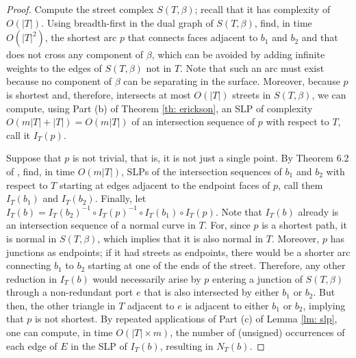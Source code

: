 \documentclass[11pt]{amsart}
\numberwithin{equation}{section}
\theoremstyle{plain}
\theoremstyle{definition}
\begin{document}
\begin{proof}
    Compute the street complex $S(T,\beta)$; recall that it has complexity of $O(|T|)$. 
    Using breadth-first in the dual graph of $S(T,\beta)$, find, in time $O(|T|^2)$, the shortest arc $p$ that connects faces adjacent to $b_1$ and $b_2$ and that does not cross any component of $\beta$, which can be avoided by adding infinite weights to the edges of $S(T,\beta)$ not in $T$. 
    Note that such an arc must exist because no component of $\beta$ can be separating in the surface. 
    Moreover, because $p$ is shortest and, therefore, intersects at most $O(|T|)$ streets in $S(T,\beta)$, we can compute, using Part (b) of Theorem \ref{th: erickson}, an SLP of complexity $O(m|T|+|T|)=O(m|T|)$ of an intersection sequence of $p$ with respect to $T$, call it $I_T(p)$.
    
    Suppose that $p$ is not trivial, that is, it is not just a single point.
    By Theorem 6.2 of \cite{Erickson2013}, find, in time $O(m|T|)$, SLPs of the intersection sequences of $b_1$ and $b_2$ with respect to $T$ starting at edges adjacent to the endpoint faces of $p$, call them $I_T(b_1)$ and $I_T(b_2)$.
    Finally, let $I_T(b)=I_T(b_2)^{-1}\circ I_T(p)^{-1}\circ I_T(b_1)\circ I_T(p)$.  
    Note that $I_T(b)$ already is an intersection sequence of a normal curve in $T$.
    For, since $p$ is a shortest path, it is normal in $S(T,\beta)$, which implies that it is also normal in $T$.
    Moreover, $p$ has junctions as endpoints; if it had streets as endpoints, there would be a shorter arc connecting $b_1$ to $b_2$ starting at one of the ends of the street.
    Therefore, any other reduction in $I_T(b)$ would necessarily arise by $p$ entering a junction of $S(T, \beta)$ through a non-redundant port $e$ that is also intersected by either $b_1$ or $b_2$.
    But then, the other triangle in $T$ adjacent to $e$ is adjacent to either $b_1$ or $b_2$, implying that $p$ is not shortest. 
    By repeated applications of Part (c) of Lemma \ref{lm: slp}, one can compute, in time $O(|T|\times m)$, the number of (unsigned) occurrences of each edge of $E$ in the SLP of $I_T(b)$, resulting in $N_T(b)$. 


\end{proof}
\end{document}
